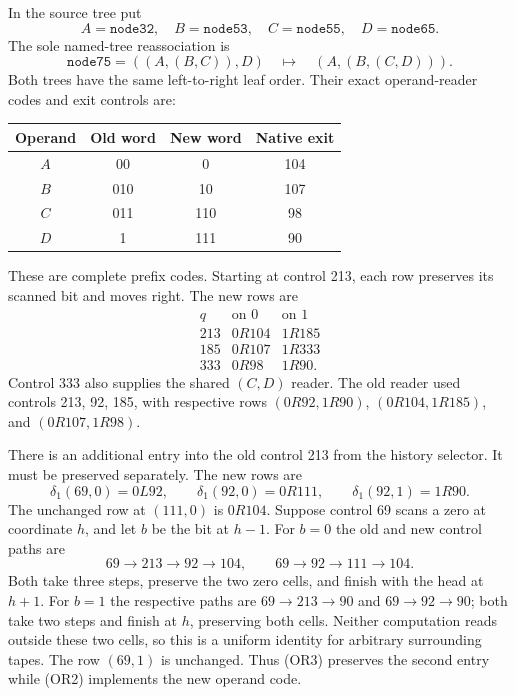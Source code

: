 In the source tree put
\[
 A=\texttt{node32},\quad B=\texttt{node53},\quad
 C=\texttt{node55},\quad D=\texttt{node65}.
\]
The sole named-tree reassociation is
\[
 \texttt{node75}=((A,(B,C)),D)
       \quad\longmapsto\quad (A,(B,(C,D))).
 \tag{OR1}
\]
Both trees have the same left-to-right leaf order.  Their exact
operand-reader codes and exit controls are:
\begin{center}
\begin{tabular}{cccc}
\toprule
Operand & Old word & New word & Native exit\\
\midrule
$A$ & 00 & 0   & 104\\
$B$ & 010& 10  & 107\\
$C$ & 011& 110 & 98\\
$D$ & 1  & 111 & 90\\
\bottomrule
\end{tabular}
\end{center}
These are complete prefix codes.  Starting at control 213, each row
preserves its scanned bit and moves right.  The new rows are
\[
\begin{array}{c|cc}
q&\text{on }0&\text{on }1\\\hline
213&0R104&1R185\\
185&0R107&1R333\\
333&0R98&1R90.
\end{array}
\tag{OR2}
\]
Control 333 also supplies the shared $(C,D)$ reader.  The old reader
used controls 213, 92, 185, with respective rows
$(0R92,1R90)$, $(0R104,1R185)$, and $(0R107,1R98)$.

There is an additional entry into the old control 213 from the history
selector.  It must be preserved separately.  The new rows are
\[
 \delta_1(69,0)=0L92,\qquad
 \delta_1(92,0)=0R111,\qquad
 \delta_1(92,1)=1R90.
 \tag{OR3}
\]
The unchanged row at $(111,0)$ is $0R104$.
Suppose control 69 scans a zero at coordinate $h$, and let $b$ be
the bit at $h-1$.  For $b=0$ the old and new control paths are
\[
 69\longrightarrow213\longrightarrow92\longrightarrow104,
 \qquad
 69\longrightarrow92\longrightarrow111\longrightarrow104.
\]
Both take three steps, preserve the two zero cells, and finish with
the head at $h+1$.  For $b=1$ the respective paths are
$69\to213\to90$ and $69\to92\to90$; both take two steps and
finish at $h$, preserving both cells.  Neither computation reads
outside these two cells, so this is a uniform identity for arbitrary
surrounding tapes.  The row $(69,1)$ is unchanged.  Thus (OR3)
preserves the second entry while (OR2) implements the new operand code.

